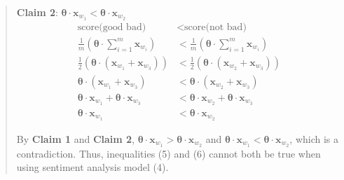 \begin{quote}
    {\bf Claim 2}: $\mathbf{\theta} \cdot \textbf{x}_{w_1} < \mathbf{\theta} \cdot \textbf{x}_{w_2}$
    \begin{align*}
	\textrm{score(good bad)} &< \textrm{score(not bad)} \\
	\frac{1}{m} \left( \mathbf{\theta} \cdot \sum_{i=1}^m \textbf{x}_{w_i} \right) &< \frac{1}{m} \left( \mathbf{\theta} \cdot \sum_{i=1}^m \textbf{x}_{w_i} \right) \\
	\frac{1}{2} \left( \mathbf{\theta} \cdot \left( \textbf{x}_{w_1} + \textbf{x}_{w_3} \right) \right) &< \frac{1}{2} \left( \mathbf{\theta} \cdot \left( \textbf{x}_{w_2} + \textbf{x}_{w_3} \right) \right) \\
    \mathbf{\theta} \cdot \left( \textbf{x}_{w_1} + \textbf{x}_{w_3} \right) &< \mathbf{\theta} \cdot \left( \textbf{x}_{w_2} + \textbf{x}_{w_3} \right) \\
	\mathbf{\theta} \cdot \textbf{x}_{w_1} + \mathbf{\theta} \cdot \textbf{x}_{w_3}  &< \mathbf{\theta} \cdot \textbf{x}_{w_2} + \mathbf{\theta} \cdot \textbf{x}_{w_3} \\
	\mathbf{\theta} \cdot \textbf{x}_{w_1} &< \mathbf{\theta} \cdot \textbf{x}_{w_2}
    \end{align*}

    By {\bf Claim 1} and {\bf Claim 2}, $\mathbf{\theta} \cdot \textbf{x}_{w_1} > \mathbf{\theta} \cdot \textbf{x}_{w_2}$ and $\mathbf{\theta} \cdot \textbf{x}_{w_1} < \mathbf{\theta} \cdot \textbf{x}_{w_2}$, which is a contradiction. Thus, inequalities (5) and (6) cannot both be true when using sentiment analysis model (4).
\end{quote}
